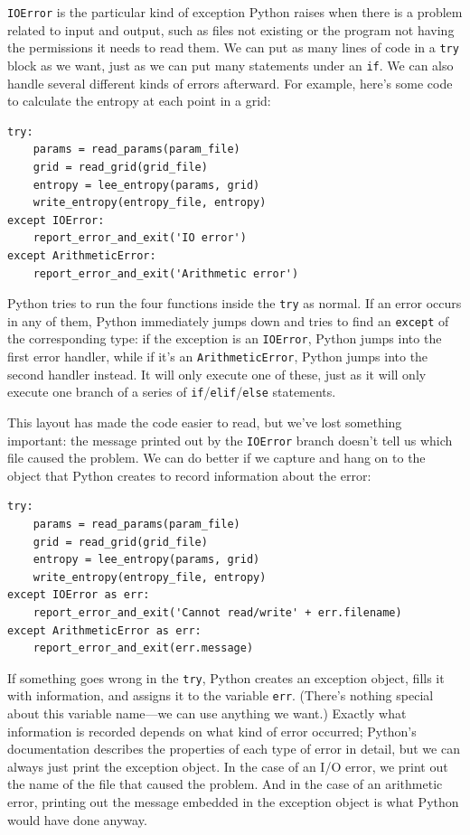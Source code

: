 \documentclass{book}
\begin{document}
\texttt{IOError} is the particular kind of exception Python raises when
there is a problem related to input and output, such as files not
existing or the program not having the permissions it needs to read
them. We can put as many lines of code in a \texttt{try} block as we
want, just as we can put many statements under an \texttt{if}. We can
also handle several different kinds of errors afterward. For example,
here's some code to calculate the entropy at each point in a grid:

\begin{verbatim}
try:
    params = read_params(param_file)
    grid = read_grid(grid_file)
    entropy = lee_entropy(params, grid)
    write_entropy(entropy_file, entropy)
except IOError:
    report_error_and_exit('IO error')
except ArithmeticError:
    report_error_and_exit('Arithmetic error')
\end{verbatim}

Python tries to run the four functions inside the \texttt{try} as
normal. If an error occurs in any of them, Python immediately jumps down
and tries to find an \texttt{except} of the corresponding type: if the
exception is an \texttt{IOError}, Python jumps into the first error
handler, while if it's an \texttt{ArithmeticError}, Python jumps into
the second handler instead. It will only execute one of these, just as
it will only execute one branch of a series of
\texttt{if}/\texttt{elif}/\texttt{else} statements.

This layout has made the code easier to read, but we've lost something
important: the message printed out by the \texttt{IOError} branch
doesn't tell us which file caused the problem. We can do better if we
capture and hang on to the object that Python creates to record
information about the error:

\begin{verbatim}
try:
    params = read_params(param_file)
    grid = read_grid(grid_file)
    entropy = lee_entropy(params, grid)
    write_entropy(entropy_file, entropy)
except IOError as err:
    report_error_and_exit('Cannot read/write' + err.filename)
except ArithmeticError as err:
    report_error_and_exit(err.message)
\end{verbatim}

If something goes wrong in the \texttt{try}, Python creates an exception
object, fills it with information, and assigns it to the variable
\texttt{err}. (There's nothing special about this variable name---we can
use anything we want.) Exactly what information is recorded depends on
what kind of error occurred; Python's documentation describes the
properties of each type of error in detail, but we can always just print
the exception object. In the case of an I/O error, we print out the name
of the file that caused the problem. And in the case of an arithmetic
error, printing out the message embedded in the exception object is what
Python would have done anyway.
\end{document}
